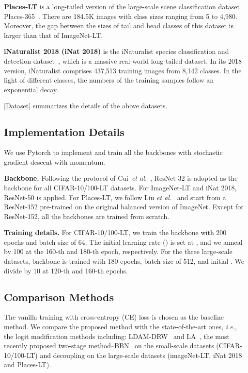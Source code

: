 \documentclass{article}
\def\ie{\emph{i.e.}} \def\Ie{\emph{I.e}\onedot}
\def\etal{\emph{et al.}}
\begin{document}
\noindent\textbf{Places-LT} is a long-tailed version of the large-scale scene classification dataset Places-365~\cite{Zhou2018places}. There are 184.5K images with class sizes ranging from 5 to 4,980. Moreover, the gap between the sizes of tail and head classes of this dataset is larger than that of ImageNet-LT.

\noindent\textbf{iNaturalist 2018 (iNat 2018)} is the iNaturalist species classification and detection dataset~\cite{van2018inaturalist}, which is a massive real-world long-tailed dataset. In its 2018 version, iNaturalist comprises 437,513 training images from 8,142 classes. In the light of different classes, the numbers of the training samples follow an exponential decay.

\cref{Dataset} summarizes the details of the above datasets.


\subsection{Implementation Details}
We use Pytorch to implement and train all the backbones with stochastic gradient descent with momentum. 

\noindent\textbf{Backbone.}
Following the protocol of Cui~\etal~\cite{cui2019class}, ResNet-32 is adopted as the backbone for all CIFAR-10/100-LT datasets. For ImageNet-LT and iNat 2018, ResNet-50 is applied. For Places-LT, we follow Liu \etal~\cite{liu2019large} and start from a ResNet-152 pre-trained on the original balanced version of ImageNet. Except for ResNet-152, all the backbones are trained from scratch.

\noindent\textbf{Training details.}
For CIFAR-10/100-LT, we train the backbone with 200 epochs and batch size of 64. The initial learning rate () is set at , and we anneal  by 100 at the 160-th and 180-th epoch, respectively. For the three large-scale datasets, backbone is trained with 180 epochs, batch size of 512, and initial . We divide  by 10 at 120-th and 160-th epochs.

\subsection{Comparison Methods}
The vanilla training with cross-entropy (CE) loss is chosen as the baseline method. We compare the proposed method with the state-of-the-art ones, \ie, the logit modification methods including: LDAM-DRW~\cite{cao2019learning} and LA~\cite{menon21long}, the most recently proposed two-stage method--BBN~\cite{bbn20} on the small-scale datasets (CIFAR-10/100-LT) and decoupling on the large-scale datasets (imageNet-LT, iNat 2018 and Places-LT).
\end{document}
